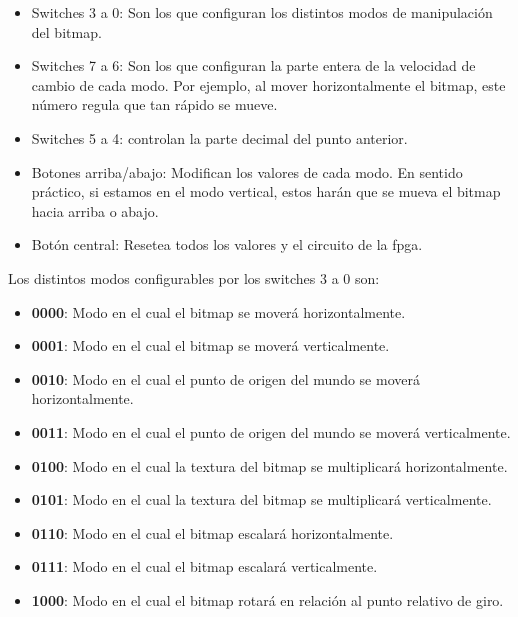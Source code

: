 \begin{itemize}
\item Switches 3 a 0: Son los que configuran los distintos modos de manipulación del bitmap.
\item Switches 7 a 6: Son los que configuran la parte entera de la velocidad de cambio de cada modo. Por ejemplo, al mover horizontalmente el bitmap, este número regula que tan rápido se mueve.
\item Switches 5 a 4: controlan la parte decimal del punto anterior.
\item Botones arriba/abajo: Modifican los valores de cada modo. En sentido práctico, si estamos en el modo vertical, estos harán que se mueva el bitmap hacia arriba o abajo.
\item Botón central: Resetea todos los valores y el circuito de la fpga.
\end{itemize}

Los distintos modos configurables por los switches 3 a 0 son:
\begin{itemize}
\item \textbf{0000}: Modo en el cual el bitmap se moverá horizontalmente.
\item \textbf{0001}: Modo en el cual el bitmap se moverá verticalmente.
\item \textbf{0010}: Modo en el cual el punto de origen del mundo se moverá horizontalmente.
\item \textbf{0011}: Modo en el cual el punto de origen del mundo se moverá verticalmente.
\item \textbf{0100}: Modo en el cual la textura del bitmap se multiplicará horizontalmente.
\item \textbf{0101}: Modo en el cual la textura del bitmap se multiplicará verticalmente.
\item \textbf{0110}: Modo en el cual el bitmap escalará horizontalmente.
\item \textbf{0111}: Modo en el cual el bitmap escalará verticalmente.
\item \textbf{1000}: Modo en el cual el bitmap rotará en relación al punto relativo de giro.
\end{itemize}

